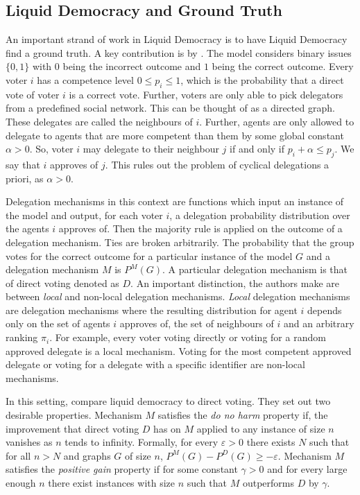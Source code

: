 \documentclass[11pt,a4paper, titlepage]{article}
\theoremstyle{definition}
\begin{document}
\subsection{Liquid Democracy and Ground Truth}
An important strand of work in Liquid Democracy is to have Liquid Democracy find a ground truth. 
A key contribution is by \citet{kahng2021liquid}. 
The model considers binary issues $\{0, 1\}$ with $0$ being the incorrect outcome and $1$ being the correct outcome. Every voter $i$ has a competence level $0 \leq p_i \leq 1$, which is the probability that a direct vote of voter $i$ is a correct vote.
Further, voters are only able to pick delegators from a predefined social network. This can be thought of as a directed graph.
These delegates are called the neighbours of $i$.
Further, agents are only allowed to delegate to agents that are more competent than them by some global constant $\alpha >0$.
So, voter $i$ may delegate to their neighbour $j$ if and only if $p_i + \alpha \leq p_j$. 
We say that $i$ approves of $j$.
This rules out the problem of cyclical delegations a priori, as $\alpha > 0$.

Delegation mechanisms in this context are functions which input an instance of the model and output, for each voter $i$, a delegation probability distribution over the agents $i$ approves of.
Then the majority rule is applied on the outcome of a delegation mechanism. Ties are broken arbitrarily.
The probability that the group votes for the correct outcome for a particular instance of the model $G$ and a delegation mechanism $M$ is $P^M(G)$.
A particular delegation mechanism is that of direct voting denoted as $D$.
An important distinction, the authors make are between \emph{local} and non-local delegation mechanisms. \emph{Local} delegation mechanisms are delegation mechanisms where the resulting distribution for agent $i$ depends only on the set of agents $i$ approves of, the set of neighbours of $i$ and an arbitrary ranking $\pi_i$.
For example, every voter voting directly or voting for a random approved delegate is a local mechanism. Voting for the most competent approved delegate or voting for a delegate with a specific identifier are non-local mechanisms.

In this setting, \citeauthor{kahng2021liquid} compare liquid democracy to direct voting. They set out two desirable properties.
Mechanism $M$ satisfies the \emph{do no harm} property if, the improvement that direct voting $D$ has on $M$ applied to any instance of size $n$ vanishes as $n$ tends to infinity.
Formally, for every $\varepsilon > 0$ there exists $N$ such that for all $n > N$ and graphs $G$ of size $n$, $P^M(G) - P^D(G) \geq - \varepsilon$.
Mechanism $M$ satisfies the \emph{positive gain} property if for some constant $\gamma > 0$ and for every large enough $n$ there exist instances with size $n$ such that $M$ outperforms $D$ by $\gamma$.
\end{document}
